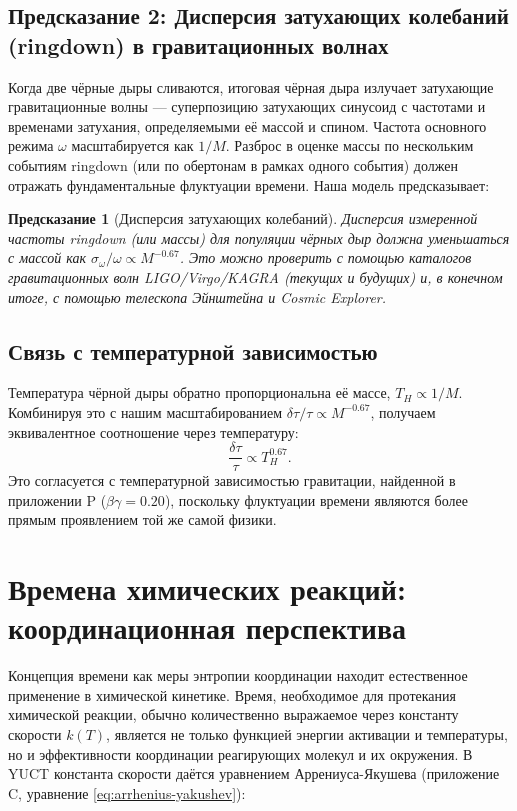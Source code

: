 \documentclass[12pt,a4paper]{article}
\newtheorem{prediction}[theorem]{Предсказание}
\begin{document}
	\subsection{Предсказание 2: Дисперсия затухающих колебаний (ringdown) в гравитационных волнах}
	
	Когда две чёрные дыры сливаются, итоговая чёрная дыра излучает затухающие гравитационные волны — суперпозицию затухающих синусоид с частотами и временами затухания, определяемыми её массой и спином. Частота основного режима \(\omega\) масштабируется как \(1/M\). Разброс в оценке массы по нескольким событиям ringdown (или по обертонам в рамках одного события) должен отражать фундаментальные флуктуации времени. Наша модель предсказывает:
	\begin{prediction}[Дисперсия затухающих колебаний]
		Дисперсия измеренной частоты ringdown (или массы) для популяции чёрных дыр должна уменьшаться с массой как \(\sigma_{\omega}/\omega \propto M^{-0.67}\). Это можно проверить с помощью каталогов гравитационных волн LIGO/Virgo/KAGRA (текущих и будущих) и, в конечном итоге, с помощью телескопа Эйнштейна и Cosmic Explorer.
	\end{prediction}
	
	\subsection{Связь с температурной зависимостью}
	
	Температура чёрной дыры обратно пропорциональна её массе, \(T_H \propto 1/M\). Комбинируя это с нашим масштабированием \(\delta\tau/\tau \propto M^{-0.67}\), получаем эквивалентное соотношение через температуру:
	\begin{equation}
		\frac{\delta\tau}{\tau} \propto T_H^{0.67}.
	\end{equation}
	Это согласуется с температурной зависимостью гравитации, найденной в приложении P (\(\beta\gamma = 0.20\)), поскольку флуктуации времени являются более прямым проявлением той же самой физики.
	
	\section{Времена химических реакций: координационная перспектива}
	\label{sec:chemistry}
	
	Концепция времени как меры энтропии координации находит естественное применение в химической кинетике. Время, необходимое для протекания химической реакции, обычно количественно выражаемое через константу скорости \(k(T)\), является не только функцией энергии активации и температуры, но и эффективности координации реагирующих молекул и их окружения. В YUCT константа скорости даётся уравнением Аррениуса-Якушева (приложение C, уравнение \ref{eq:arrhenius-yakushev}):
	
\end{document}
